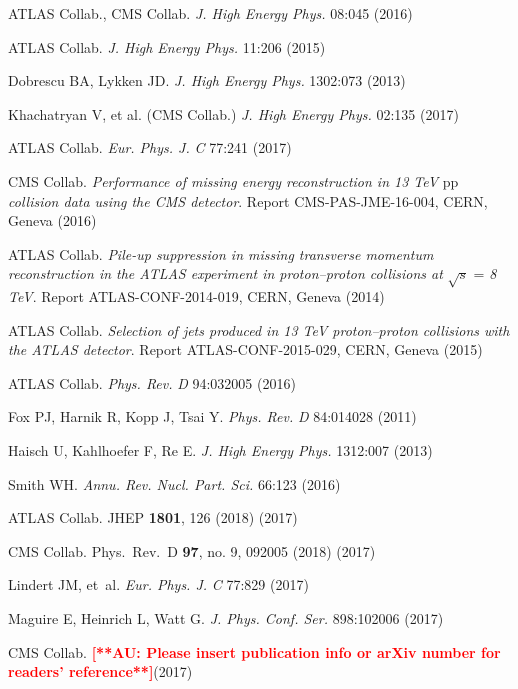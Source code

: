 \documentclass{ar-1col}
\begin{document}
\begin{thebibliography}{175}
{ATLAS Collab., CMS Collab}. \textit{J. High Energy Phys.} 08:045 (2016)

{ATLAS Collab.} \textit{J. High Energy Phys.} 11:206 (2015)

Dobrescu BA, Lykken JD. \textit{J. High Energy Phys.} 1302:073 (2013)

{Khachatryan V, et al. (CMS Collab}.) \textit{J. High Energy Phys.} 02:135 (2017)

{ATLAS Collab.} \textit{Eur. Phys. J.} \textit{C} 77:241 (2017)

{CMS Collab}. \textit{Performance of missing energy reconstruction in 13 TeV }pp \textit{collision data using the CMS detector}.
Report CMS-PAS-JME-16-004, CERN, Geneva (2016)

ATLAS Collab. \textit{Pile-up suppression in missing transverse momentum reconstruction in the ATLAS experiment in proton--proton collisions at} $\sqrt{s}$ = \textit{8 TeV}. Report ATLAS-CONF-2014-019, CERN, Geneva (2014)

ATLAS Collab. \textit{Selection of jets produced in 13 TeV proton--proton collisions with the ATLAS detector}.
Report ATLAS-CONF-2015-029, CERN, Geneva (2015)

{ATLAS Collab.} \textit{Phys. Rev.} \textit{D} 94:032005 (2016)

Fox PJ, Harnik R, Kopp J, Tsai Y. \textit{Phys. Rev.} \textit{D} 84:014028
(2011)

Haisch U, Kahlhoefer F, Re E. \textit{J. High Energy Phys.} 1312:007 (2013)

Smith WH. \textit{Annu. Rev. Nucl. Part. Sci.} 66:123 (2016)

{ATLAS Collab.} JHEP {\bf 1801}, 126 (2018) (2017)

{CMS Collab.} Phys.\ Rev.\ D {\bf 97}, no. 9, 092005 (2018) (2017)

Lindert JM, et~al. \textit{Eur. Phys. J.} \textit{C} 77:829 (2017)

Maguire E, Heinrich L, Watt G. \textit{J. Phys. Conf. Ser.}
898:102006 (2017)

{CMS Collab}. \textbf{\textcolor{red}{[**AU: Please insert publication info or arXiv number for readers' reference**]}}(2017)


\end{thebibliography}
\end{document}
